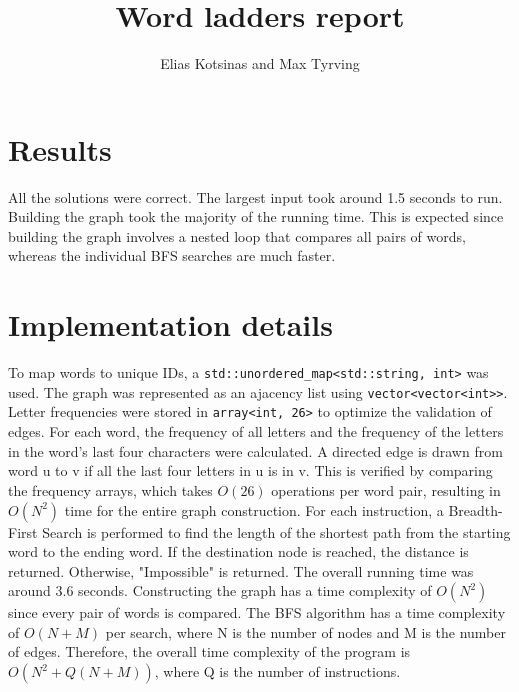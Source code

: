 \documentclass{article}
\title{Word ladders report}
\author{Elias Kotsinas and Max Tyrving}
\begin{document}
  \maketitle

  \section{Results}


  All the solutions were correct. The largest input took around 1.5 seconds to run. Building the graph took the majority of the running time. This is expected since building the graph involves a nested loop that compares all pairs of words, whereas the individual BFS searches are much faster.

  \section{Implementation details}

  
  To map words to unique IDs, a \texttt{std::unordered\_map<std::string, int>} was used. The graph was represented as an ajacency list using \texttt{vector<vector<int>>}. Letter frequencies were stored in \texttt{array<int, 26>} to optimize the validation of edges.
  For each word, the frequency of all letters and the frequency of the letters in the word's last four characters were calculated. A directed edge is drawn from word u to v if all the last four letters in u is in v. This is verified by comparing the 
  frequency arrays, which takes $O(26)$ operations per word pair, resulting in $O(N^2)$ time for the entire graph construction.
  For each instruction, a Breadth-First Search is performed to find the length of the shortest path from the starting word to the ending word. If the destination node is reached, the distance is returned. Otherwise, "Impossible" is returned.
  The overall running time was around 3.6 seconds. Constructing the graph has a time complexity of $O(N^2)$ since every pair of words is compared. The BFS algorithm has a time complexity of $O(N + M)$ per search, where N is the number of nodes and M is the number of edges. 
  Therefore, the overall time complexity of the program is $O(N^2 + Q(N + M))$, where Q is the number of instructions. 
\end{document}
